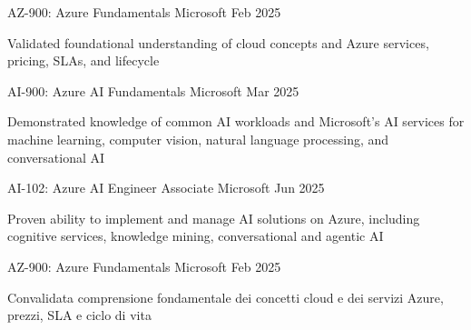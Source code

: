 


\begin{cventries}

\ifenglish
{} %
{AZ-900: Azure Fundamentals} %
{Microsoft} %
{Feb 2025} %
{ %
\begin{cvitems}
  \item {Validated foundational understanding of cloud concepts and Azure services, pricing, SLAs, and lifecycle}
\end{cvitems}
}

{AI-900: Azure AI Fundamentals} %
{Microsoft} %
{Mar 2025} %
{ %
\begin{cvitems}
  \item {Demonstrated knowledge of common AI workloads and Microsoft's AI services for machine learning, computer vision, natural language processing, and conversational AI}
\end{cvitems}
}

{AI-102: Azure AI Engineer Associate} %
{Microsoft} %
{Jun 2025} %
{ %
\begin{cvitems}
  \item {Proven ability to implement and manage AI solutions on Azure, including cognitive services, knowledge mining, conversational and agentic AI}
\end{cvitems}
}
\else
{} %
{AZ-900: Azure Fundamentals} %
{Microsoft} %
{Feb 2025} %
{ %
\begin{cvitems}
  \item {Convalidata comprensione fondamentale dei concetti cloud e dei servizi Azure, prezzi, SLA e ciclo di vita}
\end{cvitems}
}


\end{cventries}
